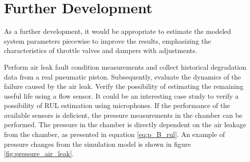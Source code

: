 \section{Further Development}
As a further development, it would be appropriate to estimate the modeled
system parameters piecewise to improve the results, emphasizing the
characteristics of throttle valves and dampers with adjustments. 

Perform air leak fault condition measurements and collect historical
degradation data from a real pneumatic piston. Subsequently, evaluate the
dynamics of the failure caused by the air leak. Verify the possibility of
estimating the remaining useful life using a flow sensor. It could be an
interesting case study to verify a possibility of RUL estimation using
microphones. If the performance of the available sensors is deficient, the
pressure measurements in the chamber can be performed. The pressure in the
chamber is directly dependent on the air leakage from the chamber, as
presented in equation \ref{eq:p_B_rul}. An example of pressure changes from the
simulation model is shown in figure \ref{fig:pressure_air_leak}.

